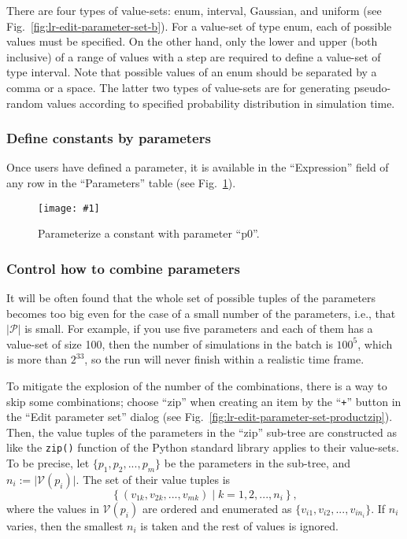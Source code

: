 \documentclass[a4paper,10pt]{report}
\newcommand\FigureOfImage[2]{\begin{figure}[h]
  \centering
  \texttt{[image: \#1]}
  \caption{#2}\label{fig:#1}
\end{figure}}
\begin{document}
There are four types of value-sets: enum, interval, Gaussian, and uniform
(see Fig.~\ref{fig:lr-edit-parameter-set-b}).
For a value-set of type enum, each of possible values must be specified.
On the other hand, only the lower and upper (both inclusive) of a range
of values with a step are required to define a value-set of type interval.
Note that possible values of an enum should be separated by a comma or a space.
The latter two types of value-sets are for generating pseudo-random values
according to specified probability distribution in simulation time.

\subsubsection{Define constants by parameters}
Once users have defined a parameter, it is available in the ``Expression'' field
of any row in the ``Parameters'' table (see Fig.~\ref{fig:lr-parameter-set}).
\FigureOfImage{lr-parameter-set}{Parameterize a constant with parameter ``p0''.}

\subsubsection{Control how to combine parameters}\label{subsubsec:productzip}
It will be often found that the whole set of possible tuples of the parameters
becomes too big even for the case of a small number of the parameters, i.e., that
$\lvert \mathcal{P} \rvert$ is small. For example, if you use five parameters
and each of them has a value-set of size 100, then the number of simulations
in the batch is $100^5$, which is more than $2^{33}$, so the run will never finish
within a realistic time frame.

To mitigate the explosion of the number of the combinations, there is a way
to skip some combinations; choose ``zip'' when creating an item by the
``\verb|+|'' button in the ``Edit parameter set'' dialog
(see Fig.~\ref{fig:lr-edit-parameter-set-productzip}).
Then, the value tuples of the parameters in the ``zip'' sub-tree are constructed
as like the \verb|zip()| function of the Python standard library
\cite{pythonstdlib} applies to their value-sets.
To be precise, let $\{p_1, p_2, ..., p_m\}$ be the parameters in the sub-tree,
and $n_i := \lvert \mathcal{V}(p_i) \rvert$.
The set of their value tuples is
\[
\left\{(v_{1 k}, v_{2 k}, ..., v_{m k}) \mid k = 1, 2, ..., n_i \right\},
\]
where the values in $\mathcal{V}(p_i)$ are ordered and enumerated as
$\{v_{i 1}, v_{i 2}, ..., v_{i n_i} \}$.
If $n_i$ varies, then the smallest $n_i$ is taken and the rest of values is
ignored.
\end{document}
